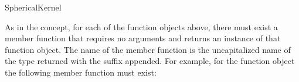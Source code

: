 \begin{ccRefConcept}{SphericalKernel}
\ccGlue
{}



\ccOperations

As in the  concept, for each of the function objects
above, there must exist a member function that requires no arguments
and returns an instance of that function object. The name of the
member function is the uncapitalized name of the type returned with
the suffix  appended. For example, for the function object 
 the following member function 
must exist: 


\ccSeeAlso


\end{ccRefConcept}
